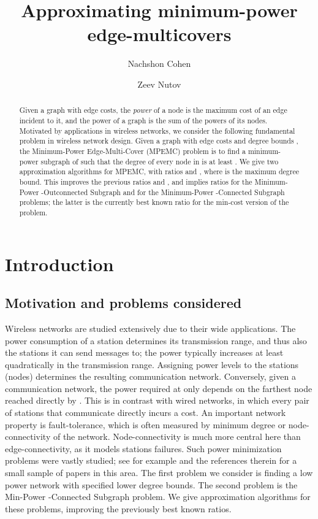 \documentclass{llncs}
\begin{document}
\title{Approximating minimum-power edge-multicovers}

\author{Nachshon Cohen \and Zeev Nutov}

\maketitle

\begin{abstract}
Given a graph with edge costs, the {\em power} of a node is the
maximum cost of an edge incident to it, and the power of a graph is
the sum of the powers of its nodes. Motivated by applications in
wireless networks, we consider the following fundamental problem 
in wireless network design. Given a graph  
with edge costs and degree bounds , 
the {\sf Minimum-Power Edge-Multi-Cover} ({\sf MPEMC}) problem  is to find a
minimum-power subgraph  of  such that the degree of every node  in  
is at least . We give two approximation algorithms for {\sf MPEMC},
with ratios  and , where  is the maximum 
degree bound.
This improves the previous ratios  and , and implies ratios 
 for the {\sf Minimum-Power -Outconnected Subgraph} and 
 for the {\sf Minimum-Power -Connected Subgraph}
problems; the latter is the currently best known ratio for the min-cost version
of the problem. 
\end{abstract}

\section{Introduction} \label{s:intro}

\subsection{Motivation and problems considered}

Wireless networks are studied extensively due to their wide applications. 
The power consumption of a station determines its transmission range, and thus also 
the stations it can send messages to; the power typically increases at least
quadratically in the transmission range. Assigning power levels to
the stations (nodes) determines the resulting communication network.
Conversely, given a communication network, the power required at 
only depends on the farthest node reached directly by .
This is in contrast with wired networks, in which every pair of stations 
that communicate directly incurs a cost. 
An important network property is fault-tolerance, which is often measured
by minimum degree or node-connectivity of the network.
Node-connectivity is much more central here than edge-connectivity,
as it models stations failures. Such power minimization problems were vastly studied;
see for example \cite{ACMP,HKMN,LYN,N-dir,zeev-p} and the references therein for 
a small sample of papers in this area.
The first problem we consider is finding a low power network with 
specified lower degree bounds.
The second problem is the {\sf Min-Power -Connected Subgraph} problem. 
We give approximation algorithms for these problems,
improving the previously best known ratios.
\end{document}
